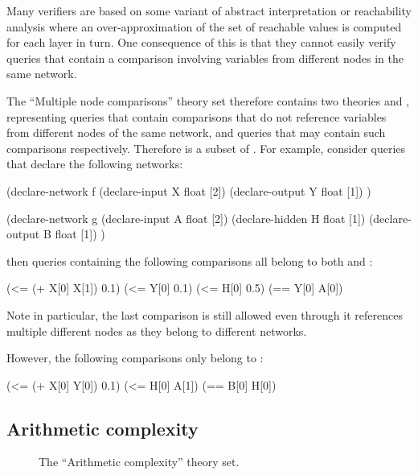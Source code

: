 Many verifiers are based on some variant of abstract interpretation or reachability analysis where an over-approximation of the set of reachable values is computed for each layer in turn.
One consequence of this is that they cannot easily verify queries that contain a comparison involving variables from different nodes in the same network.

The ``Multiple node comparisons'' theory set therefore contains two theories \snc{} and \mnc{}, representing queries that contain comparisons that do not reference variables from different nodes of the same network, and queries that may contain such comparisons respectively. Therefore \snc{} is a subset of \mnc{}. For example, consider queries that declare the following networks:

\begin{code}[style=lbnf]
(declare-network f
    (declare-input  X float [2])
    (declare-output Y float [1])
)

(declare-network g
    (declare-input  A float [2])
    (declare-hidden H float [1])
    (declare-output B float [1])
)
\end{code}

\noindent then queries containing the following comparisons all belong to both \snc{} and \mnc{}:

\begin{code}[style=lbnf]
(<= (+ X[0] X[1]) 0.1)
(<= Y[0] 0.1)
(<= H[0] 0.5)
(== Y[0] A[0])
\end{code}

\noindent Note in particular, the last comparison is still allowed even through it references multiple different nodes as they belong to different networks. 

However, the following comparisons only belong to \mnc{}:

\begin{code}[style=lbnf]
(<= (+ X[0] Y[0]) 0.1)
(<= H[0] A[1])
(== B[0] H[0])
\end{code}

\subsection{Arithmetic complexity}
\label{sec:arithmetic-complexity}

\begin{figure}[h]
\centering
{}
\caption{The ``Arithmetic complexity'' theory set.}
\label{fig:arithmetic-complexities}
\end{figure}

